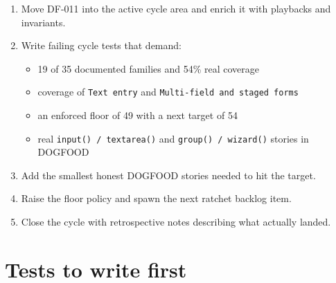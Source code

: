 \begin{enumerate}
\def\labelenumi{\arabic{enumi}.}
\tightlist
\item
  Move DF-011 into the active cycle area and enrich it with playbacks and invariants.
\item
  Write failing cycle tests that demand:

  \begin{itemize}
  \tightlist
  \item
    19 of 35 documented families and 54\% real coverage
  \item
    coverage of \texttt{T\allowbreak{}e\allowbreak{}x\allowbreak{}t\allowbreak{} \allowbreak{}e\allowbreak{}n\allowbreak{}t\allowbreak{}r\allowbreak{}y} and \texttt{M\allowbreak{}u\allowbreak{}l\allowbreak{}t\allowbreak{}i\allowbreak{}-\allowbreak{}f\allowbreak{}i\allowbreak{}e\allowbreak{}l\allowbreak{}d\allowbreak{} \allowbreak{}a\allowbreak{}n\allowbreak{}d\allowbreak{} \allowbreak{}s\allowbreak{}t\allowbreak{}a\allowbreak{}g\allowbreak{}e\allowbreak{}d\allowbreak{} \allowbreak{}f\allowbreak{}o\allowbreak{}r\allowbreak{}m\allowbreak{}s}
  \item
    an enforced floor of 49 with a next target of 54
  \item
    real \texttt{i\allowbreak{}n\allowbreak{}p\allowbreak{}u\allowbreak{}t\allowbreak{}(\allowbreak{})\allowbreak{} \allowbreak{}/\allowbreak{} \allowbreak{}t\allowbreak{}e\allowbreak{}x\allowbreak{}t\allowbreak{}a\allowbreak{}r\allowbreak{}e\allowbreak{}a\allowbreak{}(\allowbreak{})} and \texttt{g\allowbreak{}r\allowbreak{}o\allowbreak{}u\allowbreak{}p\allowbreak{}(\allowbreak{})\allowbreak{} \allowbreak{}/\allowbreak{} \allowbreak{}w\allowbreak{}i\allowbreak{}z\allowbreak{}a\allowbreak{}r\allowbreak{}d\allowbreak{}(\allowbreak{})} stories in DOGFOOD
  \end{itemize}
\item
  Add the smallest honest DOGFOOD stories needed to hit the target.
\item
  Raise the floor policy and spawn the next ratchet backlog item.
\item
  Close the cycle with retrospective notes describing what actually landed.
\end{enumerate}

\section{Tests to write first}\label{record-073-tests-to-write-first}

